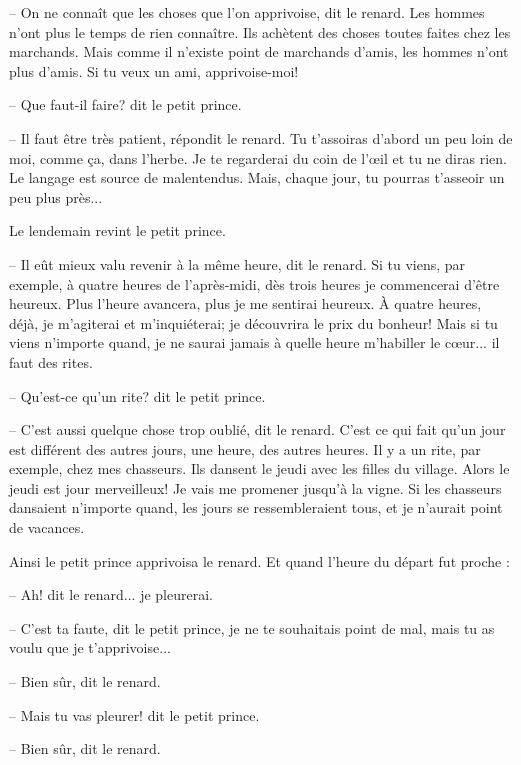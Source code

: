 \documentclass[a4paper]{report}
\begin{document}
-- On ne connaît que les choses que l'on apprivoise, dit le renard. Les hommes n'ont plus le temps de rien connaître. Ils achètent des choses toutes faites chez les marchands. Mais comme il n'existe point de marchands d'amis, les hommes n'ont plus d'amis. Si tu veux un ami, apprivoise-moi!

-- Que faut-il faire? dit le petit prince.

-- Il faut être très patient, répondit le renard. Tu t'assoiras d'abord un peu loin de moi, comme ça, dans l'herbe. Je te regarderai du coin de l'œil et tu ne diras rien. Le langage est source de malentendus. Mais, chaque jour, tu pourras t'asseoir un peu plus près...

Le lendemain revint le petit prince.

-- Il eût mieux valu revenir à la même heure, dit le renard. Si tu viens, par exemple, à quatre heures de l'après-midi, dès trois heures je commencerai d'être heureux. Plus l'heure avancera, plus je me sentirai heureux. À quatre heures, déjà, je m'agiterai et m'inquiéterai; je découvrira le prix du bonheur! Mais si tu viens n'importe quand, je ne saurai\ft[savoir]{}{} jamais à quelle heure m'habiller le cœur... il faut des rites.

-- Qu'est-ce qu'un rite? dit le petit prince.

-- C'est aussi quelque chose trop oublié, dit le renard. C'est ce qui fait qu'un jour est différent des autres jours, une heure, des autres heures. Il y a un rite, par exemple, chez mes chasseurs. Ils dansent le jeudi avec les filles du village. Alors le jeudi est jour merveilleux! Je vais me promener jusqu'à la vigne. Si les chasseurs dansaient n'importe quand, les jours se ressembleraient tous, et je n'aurait point de vacances.


Ainsi le petit prince apprivoisa le renard. Et quand l'heure du départ fut proche :

-- Ah! dit le renard... je pleurerai.

-- C'est ta faute, dit le petit prince, je ne te souhaitais point de mal, mais tu as voulu que je t'apprivoise...

-- Bien sûr, dit le renard.

-- Mais tu vas pleurer! dit le petit prince.

-- Bien sûr, dit le renard.
\end{document}
